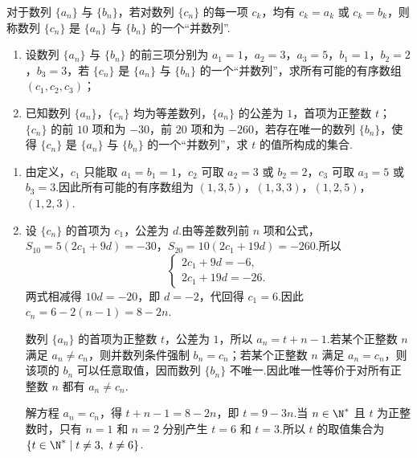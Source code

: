 \begin{problem}
对于数列 \(\{a_n\}\) 与 \(\{b_n\}\)，若对数列 \(\{c_n\}\) 的每一项 \(c_k\)，均有 \(c_k=a_k\) 或 \(c_k=b_k\)，则称数列 \(\{c_n\}\) 是 \(\{a_n\}\) 与 \(\{b_n\}\) 的一个“并数列”.

\begin{enumerate}
\item 设数列 \(\{a_n\}\) 与 \(\{b_n\}\) 的前三项分别为 \(a_1=1\)，\(a_2=3\)，\(a_3=5\)，\(b_1=1\)，\(b_2=2\)，\(b_3=3\)，若 \(\{c_n\}\) 是 \(\{a_n\}\) 与 \(\{b_n\}\) 的一个“并数列”，求所有可能的有序数组 \((c_1,c_2,c_3)\)；
\item 已知数列 \(\{a_n\}\)，\(\{c_n\}\) 均为等差数列，\(\{a_n\}\) 的公差为 \(1\)，首项为正整数 \(t\)；\(\{c_n\}\) 的前 \(10\) 项和为 \(-30\)，前 \(20\) 项和为 \(-260\)，若存在唯一的数列 \(\{b_n\}\)，使得 \(\{c_n\}\) 是 \(\{a_n\}\) 与 \(\{b_n\}\) 的一个“并数列”，求 \(t\) 的值所构成的集合.
\end{enumerate}
\end{problem}

\begin{solution}
\begin{enumerate}
\item 由定义，\(c_1\) 只能取 \(a_1=b_1=1\)，\(c_2\) 可取 \(a_2=3\) 或 \(b_2=2\)，\(c_3\) 可取 \(a_3=5\) 或 \(b_3=3\).因此所有可能的有序数组为
\((1,3,5)\)，\((1,3,3)\)，\((1,2,5)\)，\((1,2,3)\).

\item 设 \(\{c_n\}\) 的首项为 \(c_1\)，公差为 \(d\).由等差数列前 \(n\) 项和公式，
\(S_{10}=5(2c_1+9d)=-30\)，\(S_{20}=10(2c_1+19d)=-260\).所以
\[
\begin{cases}
2c_1+9d=-6,\\
2c_1+19d=-26.
\end{cases}
\]
两式相减得 \(10d=-20\)，即 \(d=-2\)，代回得 \(c_1=6\).因此
\(c_n=6-2(n-1)=8-2n\).

数列 \(\{a_n\}\) 的首项为正整数 \(t\)，公差为 \(1\)，所以 \(a_n=t+n-1\).若某个正整数 \(n\) 满足 \(a_n\neq c_n\)，则并数列条件强制 \(b_n=c_n\)；若某个正整数 \(n\) 满足 \(a_n=c_n\)，则该项的 \(b_n\) 可以任意取值，因而数列 \(\{b_n\}\) 不唯一.因此唯一性等价于对所有正整数 \(n\) 都有 \(a_n\neq c_n\).

解方程 \(a_n=c_n\)，得 \(t+n-1=8-2n\)，即 \(t=9-3n\).当 \(n\in\N^*\) 且 \(t\) 为正整数时，只有 \(n=1\) 和 \(n=2\) 分别产生 \(t=6\) 和 \(t=3\).所以 \(t\) 的取值集合为 \(\{t\in\N^*\mid t\neq3,\ t\neq6\}\).
\end{enumerate}
\end{solution}
